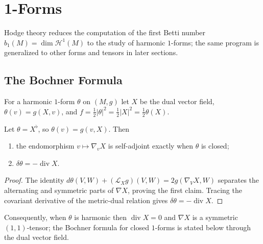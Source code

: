 \section{1-Forms}

Hodge theory reduces the computation of the first Betti number
$b_1(M)=\dim\mathcal{H}^1(M)$ to the study of harmonic $1$-forms; the same
program is generalized to other forms and tensors in later sections.

\subsection{The Bochner Formula}

For a harmonic $1$-form $\theta$ on $(M,g)$ let $X$ be the dual vector field,
$\theta(v)=g(X,v)$, and $f=\tfrac12|\theta|^2=\tfrac12|X|^2=\tfrac12\theta(X)$.

\begin{proposition}
  \label{prop:pet-ch9-vector-field-1form-duality}

  Let $\theta=X^\flat$, so $\theta(v)=g(v,X)$.  Then
  \begin{enumerate}
    \item the endomorphism $v\mapsto\nabla_vX$ is self-adjoint exactly when
      $\theta$ is closed;
    \item $\delta\theta=-\operatorname{div}X$.
  \end{enumerate}
\end{proposition}
\begin{proof}
  \sketch
  The identity
  \(d\theta(V,W)+(\mathcal L_Xg)(V,W)=2g(\nabla_VX,W)\) separates the
  alternating and symmetric parts of \(\nabla X\), proving the first claim.
  Tracing the covariant derivative of the metric-dual relation gives
  \(\delta\theta=-\operatorname{div}X\).
\end{proof}

Consequently, when $\theta$ is harmonic then $\operatorname{div}X=0$ and $\nabla X$ is a
symmetric $(1,1)$-tensor; the Bochner formula for closed $1$-forms is stated
below through the dual vector field.

